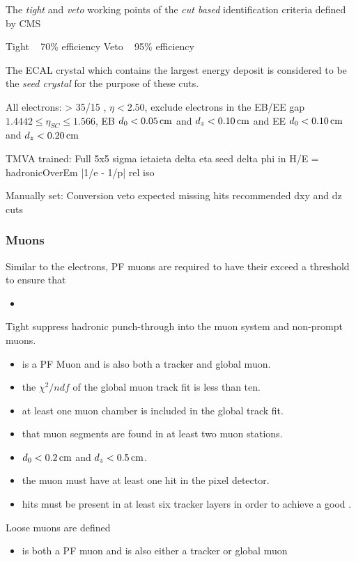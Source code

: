 The \emph{tight} and \emph{veto} working points of the  \emph{cut based} identification criteria defined by CMS 

Tight ~ 70\% efficiency
Veto ~ 95\% efficiency

The ECAL crystal which contains the largest energy deposit is considered to be the \emph{seed crystal} for the purpose of these cuts.

All electrons: \pT > 35/15 \GeVc, $\eta < 2.50$, exclude electrons in the EB/EE gap $1.4442 \leq \eta_{SC} \leq 1.566$, EB $d_{0} < 0.05\,\text{cm}$ and $d_{z} < 0.10\,\text{cm}$ and EE $d_{0} < 0.10\,\text{cm}$ and $d_{z} < 0.20\,\text{cm}$

TMVA trained: Full 5x5 sigma ietaieta
delta eta seed
delta phi in
H/E = hadronicOverEm
|1/e - 1/p|
rel iso

Manually set: 
Conversion veto
expected missing hits
recommended dxy and dz cuts

\subsubsection{Muons}\label{subsubsec:muonSelection}
Similar to the electrons, PF muons are required to have their \pt exceed a threshold to ensure that 

\begin{itemize}
\item 
\end{itemize}



Tight  
suppress hadronic punch-through into the muon system and non-prompt muons.
\begin{itemize}
\item is a PF Muon and is also both a tracker and global muon.
\item the $\chi^{2}/ndf$ of the global muon track fit is less than ten. 
\item at least one muon chamber is included in the global track fit.
\item that muon segments are found in at least two muon stations.
\item $d_{0} < 0.2\,\text{cm}$ and $d_{z} < 0.5\,\text{cm}$.
\item the muon must have at least one hit in the pixel detector.
\item hits must be present in at least six tracker layers in order to achieve a good \pT.
\end{itemize}

Loose muons are defined 
\begin{itemize}
\item is both a PF muon and is also either a tracker or global muon
\end{itemize}

